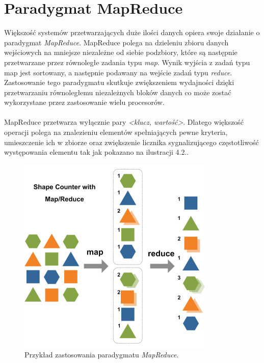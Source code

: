 \section{Paradygmat MapReduce}
Większość systemów przetwarzających duże ilości danych opiera swoje działanie o paradygmat \textit{MapReduce}. MapReduce polega na dzieleniu zbioru danych wejściowych na mniejsze niezależne od siebie podzbiory, które są następnie przetwarzane przez równoległe zadania typu \textit{map}. Wynik wyjścia z zadań typu map jest sortowany, a następnie podawany na wejście zadań typu \textit{reduce}. Zastosowanie tego paradygmatu skutkuje zwiększeniem wydajności dzięki przetwarzaniu równoległemu niezależnych bloków danych co może zostać wykorzystane przez zastosowanie wielu procesorów.\\
\\
MapReduce przetwarza wyłącznie pary \textit{<klucz, wartość>}. Dlatego większość operacji polega na znalezieniu elementów spełniających pewne kryteria, umieszczenie ich w zbiorze oraz zwiększenie licznika sygnalizującego częstotliwość występowania elementu tak jak pokazano na ilustracji 4.2..

\begin{figure}[h] %
	\centering
	\includegraphics[width=0.6\linewidth]{img/big_data_mapreduce}
	\caption{Przykład zastosowania paradygmatu \textit{MapReduce}.}
\end{figure}

